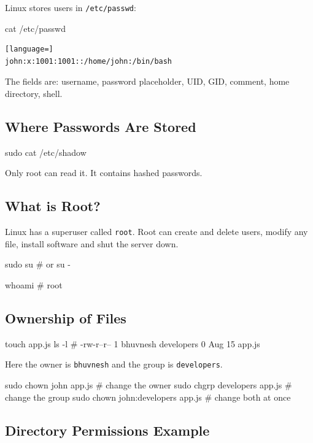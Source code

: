 \documentclass[11pt,a4paper]{article}
\begin{document}
Linux stores users in \lstinline|/etc/passwd|:

\begin{sh}
cat /etc/passwd
\end{sh}

\begin{lstlisting}[language=]
john:x:1001:1001::/home/john:/bin/bash
\end{lstlisting}

The fields are: username, password placeholder, UID, GID, comment, home directory, shell.

\subsection{Where Passwords Are Stored}

\begin{sh}
sudo cat /etc/shadow
\end{sh}

Only root can read it. It contains hashed passwords.

\subsection{What is Root?}

Linux has a superuser called \texttt{root}. Root can create and delete users, modify any
file, install software and shut the server down.

\begin{sh}
sudo su
# or
su -

whoami
# root
\end{sh}

\subsection{Ownership of Files}

\begin{sh}
touch app.js
ls -l
# -rw-r--r-- 1 bhuvnesh developers 0 Aug 15 app.js
\end{sh}

Here the owner is \texttt{bhuvnesh} and the group is \texttt{developers}.

\begin{sh}
sudo chown john app.js              # change the owner
sudo chgrp developers app.js        # change the group
sudo chown john:developers app.js   # change both at once
\end{sh}

\subsection{Directory Permissions Example}
\end{document}
